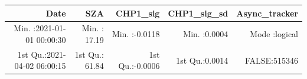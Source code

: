\documentclass[
  10pt,
  a4paper,oneside]{article}
\begin{document}
\begin{longtable}[]{@{}rrrrr@{}}
\toprule
\begin{minipage}[b]{0.26\columnwidth}\raggedleft
Date\strut
\end{minipage} & \begin{minipage}[b]{0.15\columnwidth}\raggedleft
SZA\strut
\end{minipage} & \begin{minipage}[b]{0.16\columnwidth}\raggedleft
CHP1\_sig\strut
\end{minipage} & \begin{minipage}[b]{0.15\columnwidth}\raggedleft
CHP1\_sig\_sd\strut
\end{minipage} & \begin{minipage}[b]{0.15\columnwidth}\raggedleft
Async\_tracker\strut
\end{minipage}\tabularnewline
\midrule
\endhead
\begin{minipage}[t]{0.26\columnwidth}\raggedleft
Min. :2021-01-01 00:00:30\strut
\end{minipage} & \begin{minipage}[t]{0.15\columnwidth}\raggedleft
Min. : 17.19\strut
\end{minipage} & \begin{minipage}[t]{0.16\columnwidth}\raggedleft
Min. :-0.0118\strut
\end{minipage} & \begin{minipage}[t]{0.15\columnwidth}\raggedleft
Min. :0.0004\strut
\end{minipage} & \begin{minipage}[t]{0.15\columnwidth}\raggedleft
Mode :logical\strut
\end{minipage}\tabularnewline
\begin{minipage}[t]{0.26\columnwidth}\raggedleft
1st Qu.:2021-04-02 06:00:15\strut
\end{minipage} & \begin{minipage}[t]{0.15\columnwidth}\raggedleft
1st Qu.: 61.84\strut
\end{minipage} & \begin{minipage}[t]{0.16\columnwidth}\raggedleft
1st Qu.:-0.0006\strut
\end{minipage} & \begin{minipage}[t]{0.15\columnwidth}\raggedleft
1st Qu.:0.0014\strut
\end{minipage} & \begin{minipage}[t]{0.15\columnwidth}\raggedleft
FALSE:515346\strut
\end{minipage}\tabularnewline

\end{longtable}
\end{document}
